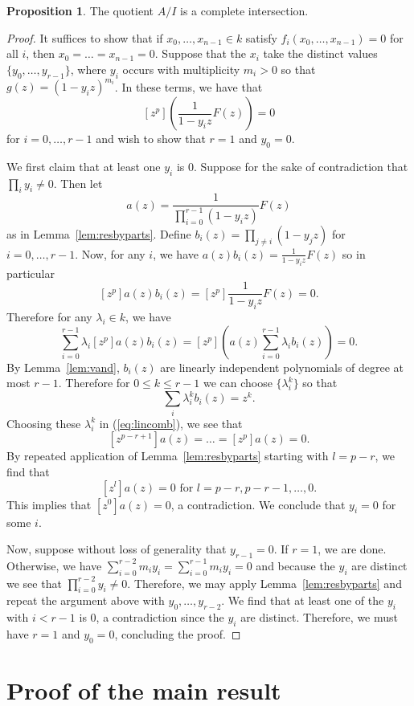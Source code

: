 \documentclass{amsart}
\numberwithin{equation}{section}
\theoremstyle{definition}
\newtheorem{proposition}[theorem]{Proposition}
\begin{document}
\begin{proposition}\label{prop:ci}
The quotient $A/I$ is a complete intersection. 
\end{proposition}
\begin{proof}
It suffices to show that if $x_0,\dots,x_{n-1} \in k$ satisfy $f_i(x_0,\dots,x_{n-1})=0$ for all $i$, then $x_0=\dots=x_{n-1}=0$.  Suppose that the $x_i$ take the distinct values $\{y_0,\dots,y_{r-1}\}$, where $y_i$ occurs with multiplicity $m_i>0$ so that $g(z)=(1-y_iz)^{m_i}$.  In these terms, we have that 
\[
[z^p]\left(\frac{1}{1-y_iz}F(z)\right)= 0
\]
for $i = 0, \ldots, r - 1$ and wish to show that $r=1$ and $y_0=0$. 

We first claim that at least one $y_i$ is $0$. Suppose for the sake of contradiction that $\prod_i y_i \ne 0$.  Then let
\[
a(z)=\frac{1}{\prod_{i=0}^{r-1}(1-y_iz)}F(z)
\]
as in Lemma~\ref{lem:resbyparts}.  Define $b_i(z)=\prod_{j \ne i} (1-y_jz)$ for $i=0,\dots,r-1$.   Now, for any $i$, we have $a(z)b_i(z)=\frac{1}{1-y_iz}F(z)$ so in particular 
\[
[z^p]a(z)b_i(z)=[z^p]\frac{1}{1-y_iz}F(z)=0.
\]
Therefore for any $\lambda_i \in k$, we have
\begin{equation}\label{eq:lincomb}
\sum_{i=0}^{r-1} \lambda_i[z^p]a(z)b_i(z)=[z^p]\left( a(z)\sum_{i=0}^{r-1}\lambda_ib_i(z)\right)=0.
\end{equation}
By Lemma~\ref{lem:vand}, $b_i(z)$ are linearly independent polynomials of degree at most $r-1$. Therefore for $0 \le k \le r-1$ we can choose $\{\lambda_i^k\}$ so that 
\[
\sum_i\lambda_i^kb_i(z)=z^k.
\]
Choosing these $\lambda_i^k$ in (\ref{eq:lincomb}), we see that
\[
[z^{p-r+1}]a(z)=\dots=[z^p]a(z)=0.
\]
By repeated application of Lemma~\ref{lem:resbyparts} starting with $l=p-r$, we find that 
\[
[z^l]a(z)=0 \text{ for $l=p-r,p-r-1,\dots,0$}.
\]
This implies that $[z^0]a(z)=0$, a contradiction. We conclude that $y_i=0$ for some $i$.

Now, suppose without loss of generality that $y_{r-1}=0$. If $r = 1$, we are done.  Otherwise, we have $\sum_{i=0}^{r-2} m_iy_i = \sum_{i=0}^{r-1} m_iy_i = 0$ and because the $y_i$ are distinct we see that $\prod_{i=0}^{r-2} y_i \ne 0$.  Therefore, we may apply Lemma~\ref{lem:resbyparts} and repeat the argument above with $y_0, \ldots, y_{r - 2}$.  We find that at least one of the $y_i$ with $i < r-1$ is $0$, a contradiction since the $y_i$ are distinct. Therefore, we must have $r=1$ and $y_0=0$, concluding the proof.
\end{proof}

\section{Proof of the main result}
\end{document}
